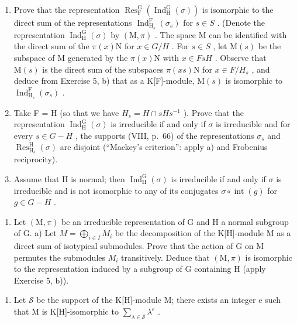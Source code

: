 \begin{enumerate}
\def\labelenumi{\alph{enumi})}
\item
  Prove that the representation \(\operatorname{Res}_{\mathrm{F}}^{\mathrm{G}}(\operatorname{Ind}_{\mathrm{H}}^{\mathrm{G}}(\sigma))\) is isomorphic to the direct sum of the representations \(\operatorname{Ind}_{\mathrm{H}_{s}}^{\mathrm{F}}(\sigma_{s})\) for \(s \in S\) . (Denote the representation \(\operatorname{Ind}_{\mathrm{H}}^{\mathrm{G}}(\sigma)\) by \((\mathrm{M}, \pi)\) . The space M can be identified with the direct sum of the \(\pi(x)\mathrm{N}\) for \(x \in G/H\) . For \(s \in S\) , let \(\mathrm{M}(s)\) be the subspace of M generated by the \(\pi(x)\mathrm{N}\) with \(x \in FsH\) . Observe that \(\mathrm{M}(s)\) is the direct sum of the subspaces \(\pi(xs)\mathrm{N}\) for \(x \in F/H_{s}\) , and deduce from Exercise 5, b) that as a K{[}F{]}-module, \(\mathrm{M}(s)\) is isomorphic to \(\operatorname{Ind}_{\mathrm{H}_{s}}^{\mathrm{F}}(\sigma_{s})\) .
\item
  Take F = H (so that we have \(H_{s} = H \cap sHs^{-1}\) ). Prove that the representation \(\operatorname{Ind}_{\mathrm{H}}^{\mathrm{G}}(\sigma)\) is irreducible if and only if \(\sigma\) is irreducible and for every \(s \in G - H\) , the supports (VIII, p.~66) of the representations \(\sigma_{s}\) and \(\operatorname{Res}_{\mathrm{H}_{s}}^{\mathrm{H}}(\sigma)\) are disjoint (``Mackey's criterion'': apply a) and Frobenius reciprocity).
\item
  Assume that H is normal; then \(\operatorname{Ind}_{\mathrm{H}}^{\mathrm{G}}(\sigma)\) is irreducible if and only if \(\sigma\) is irreducible and is not isomorphic to any of its conjugates \(\sigma \circ \operatorname{int}(g)\) for \(g \in G - H\) .
\end{enumerate}

\begin{enumerate}
\def\labelenumi{\arabic{enumi})}
\setcounter{enumi}{8}
\tightlist
\item
  Let \((\mathrm{M},\pi)\) be an irreducible representation of G and H a normal subgroup of G. a) Let \(M=\bigoplus_{i\in I}M_{i}\) be the decomposition of the K{[}H{]}-module M as a direct sum of isotypical submodules. Prove that the action of G on M permutes the submodules \(M_{i}\) transitively. Deduce that \((\mathrm{M},\pi)\) is isomorphic to the representation induced by a subgroup of G containing H (apply Exercise 5, b)).
\end{enumerate}

\begin{enumerate}
\def\labelenumi{\alph{enumi})}
\setcounter{enumi}{1}
\tightlist
\item
  Let \(\mathcal{S}\) be the support of the K{[}H{]}-module M; there exists an integer e such that M is K{[}H{]}-isomorphic to \(\sum_{\lambda\in \mathcal{S}}\lambda^{e}\) .
\end{enumerate}

